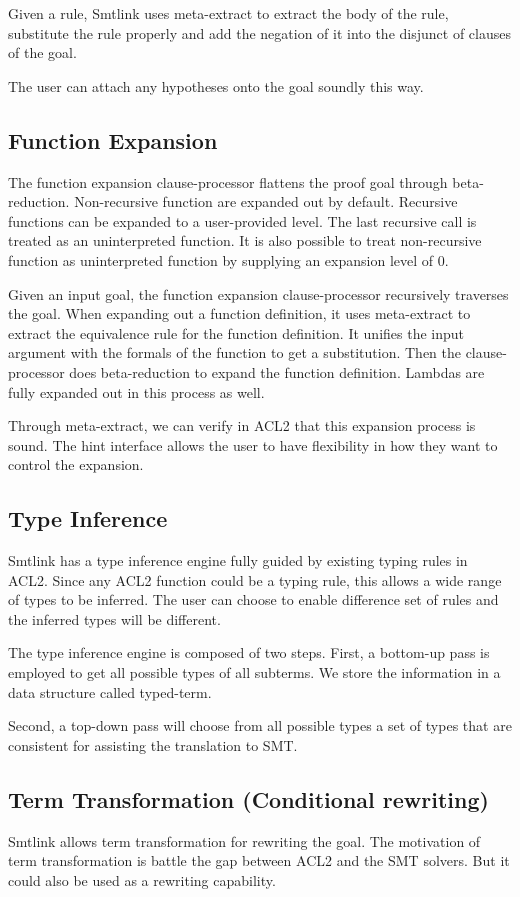 Given a rule, Smtlink uses meta-extract to extract the body of the rule,
substitute the rule properly and add the negation of it into the disjunct of
clauses of the goal.

The user can attach any hypotheses onto the goal soundly this way.

\subsection{Function Expansion}
The function expansion clause-processor flattens the proof goal through
beta-reduction. Non-recursive function are expanded out by default. Recursive
functions can be expanded to a user-provided level. The last recursive call is
treated as an uninterpreted function. It is also possible to treat non-recursive
function as uninterpreted function by supplying an expansion level of 0.

Given an input goal, the function expansion clause-processor recursively
traverses the goal. When expanding out a function definition, it uses
meta-extract to extract the equivalence rule for the function definition.
It unifies the input argument with the formals of the function to get a
substitution. Then the clause-processor does beta-reduction to expand the
function definition. Lambdas are fully expanded out in this process as well.

Through meta-extract, we can verify in ACL2 that this expansion process is
sound. The hint interface allows the user to have flexibility in how they want
to control the expansion. 

\subsection{Type Inference}
Smtlink has a type inference engine fully guided by existing typing rules in
ACL2. Since any ACL2 function could be a typing rule, this allows a wide range
of types to be inferred. The user can choose to enable difference set of rules
and the inferred types will be different.

The type inference engine is composed of two steps. First, a bottom-up pass is
employed to get all possible types of all subterms. We store the information in
a data structure called typed-term.

Second, a top-down pass will choose from all possible types a set of types that
are consistent for assisting the translation to SMT.

\subsection{Term Transformation (Conditional rewriting)}
Smtlink allows term transformation for rewriting the goal. The motivation of
term transformation is battle the gap between ACL2 and the SMT solvers. But it
could also be used as a rewriting capability.

